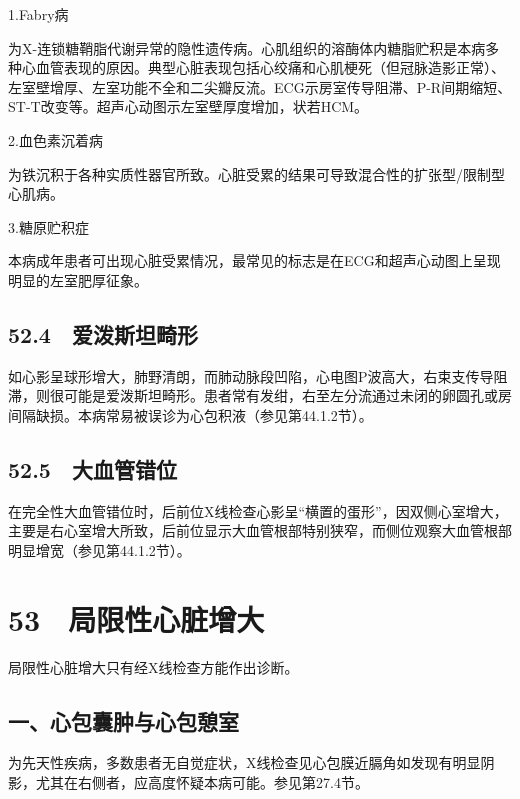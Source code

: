 \hypertarget{text00139.htmlux5cux23CHP16-3-3-2-14-1}{}
1.Fabry病

为X-连锁糖鞘脂代谢异常的隐性遗传病。心肌组织的溶酶体内糖脂贮积是本病多种心血管表现的原因。典型心脏表现包括心绞痛和心肌梗死（但冠脉造影正常）、左室壁增厚、左室功能不全和二尖瓣反流。ECG示房室传导阻滞、P-R间期缩短、ST-T改变等。超声心动图示左室壁厚度增加，状若HCM。

\hypertarget{text00139.htmlux5cux23CHP16-3-3-2-14-2}{}
2.血色素沉着病

为铁沉积于各种实质性器官所致。心脏受累的结果可导致混合性的扩张型/限制型心肌病。

\hypertarget{text00139.htmlux5cux23CHP16-3-3-2-14-3}{}
3.糖原贮积症

本病成年患者可出现心脏受累情况，最常见的标志是在ECG和超声心动图上呈现明显的左室肥厚征象。

\protect\hypertarget{text00140.html}{}{}

\subsection{52.4　爱泼斯坦畸形}

如心影呈球形增大，肺野清朗，而肺动脉段凹陷，心电图P波高大，右束支传导阻滞，则很可能是爱泼斯坦畸形。患者常有发绀，右至左分流通过未闭的卵圆孔或房间隔缺损。本病常易被误诊为心包积液（参见第44.1.2节）。

\protect\hypertarget{text00141.html}{}{}

\subsection{52.5　大血管错位}

在完全性大血管错位时，后前位X线检查心影呈“横置的蛋形”，因双侧心室增大，主要是右心室增大所致，后前位显示大血管根部特别狭窄，而侧位观察大血管根部明显增宽（参见第44.1.2节）。

\protect\hypertarget{text00142.html}{}{}

\section{53　局限性心脏增大}

局限性心脏增大只有经X线检查方能作出诊断。

\subsection{一、心包囊肿与心包憩室}

为先天性疾病，多数患者无自觉症状，X线检查见心包膜近膈角如发现有明显阴影，尤其在右侧者，应高度怀疑本病可能。参见第27.4节。

